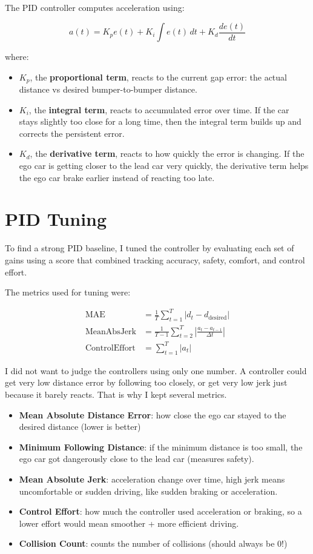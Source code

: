 \documentclass{article}
\begin{document}
The PID controller computes acceleration using:

\[
a(t) = K_p e(t) + K_i \int e(t)\,dt + K_d \frac{de(t)}{dt}
\]

where:

\begin{itemize}
    \item $K_p$, the \textbf{proportional term}, reacts to the current gap error: the actual distance vs desired bumper-to-bumper distance.
    \item $K_i$, the \textbf{integral term}, reacts to accumulated error over time. If the car stays slightly too close for a long time, then the integral term builds up and corrects the persistent error.
    \item $K_d$, the \textbf{derivative term}, reacts to how quickly the error is changing. If the ego car is getting closer to the lead car very quickly, the derivative term helps the ego car brake earlier instead of reacting too late.
\end{itemize}

\section{PID Tuning}

To find a strong PID baseline, I tuned the controller by evaluating each set of gains using a score that combined tracking accuracy, safety, comfort, and control effort.

The metrics used for tuning were:

\begin{align}
\mathrm{MAE} &= \frac{1}{T}\sum_{t=1}^{T}|d_t-d_{\mathrm{desired}}| \\
\mathrm{MeanAbsJerk} &= \frac{1}{T-1}\sum_{t=2}^{T}
\left|\frac{a_t-a_{t-1}}{\Delta t}\right| \\
\mathrm{ControlEffort} &= \sum_{t=1}^{T}|a_t|
\end{align}

I did not want to judge the controllers using only one number. A controller could get very low distance error by following too closely, or get very low jerk just because it barely reacts. That is why I kept several metrics.

\begin{itemize}
    \item \textbf{Mean Absolute Distance Error}: how close the ego car stayed to the desired distance (lower is better)
    \item \textbf{Minimum Following Distance}: if the minimum distance is too small, the ego car got dangerously close to the lead car (measures safety).
    \item \textbf{Mean Absolute Jerk}: acceleration change over time, high jerk means uncomfortable or sudden driving, like sudden braking or acceleration.
    \item \textbf{Control Effort}: how much the controller used acceleration or braking, so a lower effort would mean smoother + more efficient driving.
    \item \textbf{Collision Count}: counts the number of collisions (should always be 0!)
\end{itemize}
\end{document}
